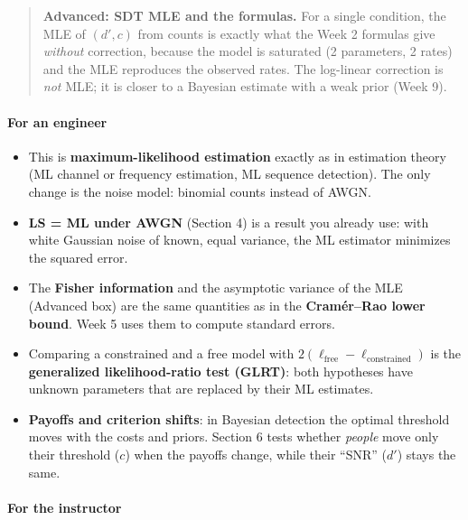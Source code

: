 \begin{quote}
\textbf{Advanced: SDT MLE and the formulas.} For a single condition, the
MLE of \((d', c)\) from counts is exactly what the Week 2 formulas give
\emph{without} correction, because the model is saturated (2 parameters,
2 rates) and the MLE reproduces the observed rates. The log-linear
correction is \emph{not} MLE; it is closer to a Bayesian estimate with a
weak prior (Week 9).
\end{quote}

\paragraph{For an engineer}

\begin{itemize}
\tightlist
\item
  This is \textbf{maximum-likelihood estimation} exactly as in
  estimation theory (ML channel or frequency estimation, ML sequence
  detection). The only change is the noise model: binomial counts
  instead of AWGN.
\item
  \textbf{LS = ML under AWGN} (Section 4) is a result you already use:
  with white Gaussian noise of known, equal variance, the ML estimator
  minimizes the squared error.
\item
  The \textbf{Fisher information} and the asymptotic variance of the MLE
  (Advanced box) are the same quantities as in the \textbf{Cramér--Rao
  lower bound}. Week 5 uses them to compute standard errors.
\item
  Comparing a constrained and a free model with
  \(2(\ell_{\text{free}} - \ell_{\text{constrained}})\) is the
  \textbf{generalized likelihood-ratio test (GLRT)}: both hypotheses
  have unknown parameters that are replaced by their ML estimates.
\item
  \textbf{Payoffs and criterion shifts}: in Bayesian detection the
  optimal threshold moves with the costs and priors. Section 6 tests
  whether \emph{people} move only their threshold (\(c\)) when the
  payoffs change, while their ``SNR'' (\(d'\)) stays the same.
\end{itemize}

\paragraph{For the instructor}

